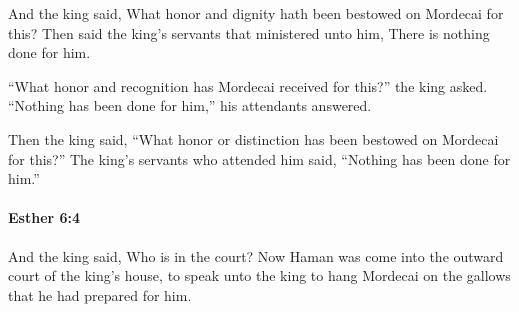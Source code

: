 			\begin{versebox}
					\item[BHS] 
					\item[LXX] 
					\item[ASV] And the king said, What honor and dignity hath been bestowed on Mordecai for this? Then said the king's servants that ministered unto him, There is nothing done for him.
					\item[NIV] “What honor and recognition has Mordecai received for this?” the king asked. “Nothing has been done for him,” his attendants answered.
					\item[NRSV] Then the king said, “What honor or distinction has been bestowed on Mordecai for this?” The king’s servants who attended him said, “Nothing has been done for him.”
			\end{versebox}

		\paragraph{Esther 6:4} %
			\label{ESTHER-6-4}

			And the king said, Who is in the court? Now Haman was come into the outward court of the king’s house, to speak unto the king to hang Mordecai on the gallows that he had prepared for him.

